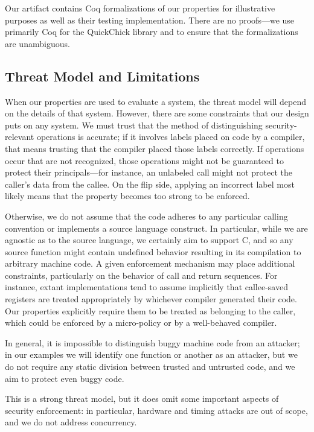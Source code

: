 \documentclass[10pt,conference]{ieeetran}%
\theoremstyle{definition}
\begin{document}
Our artifact contains Coq formalizations of our properties for illustrative purposes
as well as their testing implementation. There are no proofs---we use primarily Coq for the
QuickChick library and to ensure that the formalizations are unambiguous.
%

\subsection{Threat Model and Limitations}

When our properties are used to evaluate a system, the threat model will depend on the
details of that system. However, there are some constraints that our design puts on
any system. We must trust that the method of distinguishing security-relevant operations is accurate; if it
involves labels placed on code by a compiler, that means trusting that the compiler placed
those labels correctly. If operations occur that are not recognized, those operations
might not be guaranteed to protect their principals---for instance, an unlabeled call
might not protect the caller's data from the callee. On the flip side, applying an incorrect
label most likely means that the property becomes too strong to be enforced.

Otherwise, we do not assume that the code adheres to any particular
calling convention or implements a source language construct.
In particular, while we are agnostic as to the source
language, we certainly aim to support C, and so any source function might contain undefined
behavior resulting in its compilation to arbitrary machine code. A given enforcement
mechanism may place additional constraints, particularly on the behavior of
call and return sequences. For instance, extant implementations tend to assume
implicitly that callee-saved registers are treated appropriately by whichever compiler
generated their code. Our properties explicitly require them to be treated as belonging
to the caller, which could be enforced by a micro-policy or by a well-behaved compiler.
%

In general, it is impossible to distinguish buggy machine code from an attacker; in
our examples we will identify one function or another as an attacker, but we do not
require any static division between trusted and untrusted code, and we aim to protect
even buggy code.

This is a strong threat model, but it does omit some important aspects of
security enforcement: in particular, hardware and timing attacks are out of scope, and
we do not address concurrency.
%
\end{document}
